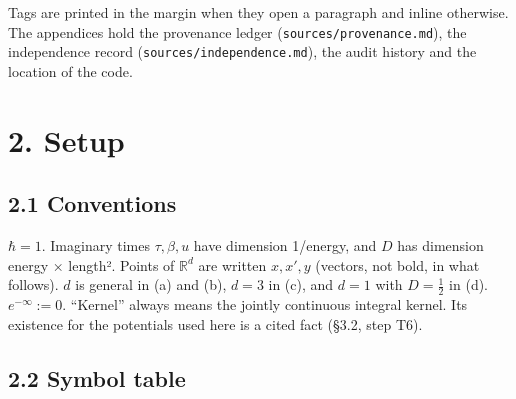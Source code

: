 \documentclass[11pt,a4paper]{article}
\begin{document}
Tags are printed in the margin when they open a paragraph and inline otherwise. The appendices hold the provenance ledger (\texttt{sources/provenance.md}), the independence record (\texttt{sources/independence.md}), the audit history and the location of the code.

\hypertarget{setup}{%
\section{2. Setup}\label{setup}}

\hypertarget{conventions}{%
\subsection{2.1 Conventions}\label{conventions}}

\(\hbar=1\). Imaginary times \(\tau,\beta,u\) have dimension 1/energy, and \(D\) has dimension energy × length². Points of \(\mathbb R^d\) are written \(x,x',y\) (vectors, not bold, in what follows). \(d\) is general in (a) and (b), \(d=3\) in (c), and \(d=1\) with \(D=\tfrac12\) in (d). \(e^{-\infty}:=0\). ``Kernel'' always means the jointly continuous integral kernel. Its existence for the potentials used here is a cited fact (§3.2, step T6).

\hypertarget{symbol-table}{%
\subsection{2.2 Symbol table}\label{symbol-table}}
\end{document}
